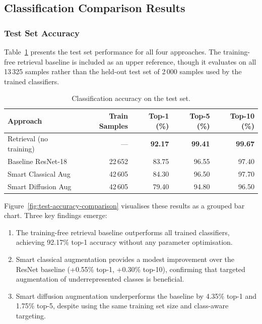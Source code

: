 \subsection{Classification Comparison Results}

\subsubsection{Test Set Accuracy}

Table~\ref{tab:classification-comparison} presents the test set performance for all four approaches.
The training-free retrieval baseline is included as an upper reference, though it evaluates on all 13\,325 samples rather than the held-out test set of 2\,000 samples used by the trained classifiers.

\begin{table}[htbp]
\centering
\caption{Classification accuracy on the test set.}
\label{tab:classification-comparison}
\begin{tabular}{lrrrr}
\toprule
\textbf{Approach} & \textbf{Train Samples} & \textbf{Top-1 (\%)} & \textbf{Top-5 (\%)} & \textbf{Top-10 (\%)} \\
\midrule
Retrieval (no training)  & ---     & \textbf{92.17} & \textbf{99.41} & \textbf{99.67} \\
Baseline ResNet-18       & 22\,652 & 83.75          & 96.55          & 97.40          \\
Smart Classical Aug      & 42\,605 & 84.30          & 96.50          & 97.70          \\
Smart Diffusion Aug      & 42\,605 & 79.40          & 94.80          & 96.50          \\
\bottomrule
\end{tabular}
\end{table}

Figure~\ref{fig:test-accuracy-comparison} visualises these results as a grouped bar chart.
Three key findings emerge:

\begin{enumerate}
    \item The training-free retrieval baseline outperforms all trained classifiers, achieving 92.17\% top-1 accuracy without any parameter optimisation.
    \item Smart classical augmentation provides a modest improvement over the ResNet baseline (+0.55\% top-1, +0.30\% top-10), confirming that targeted augmentation of underrepresented classes is beneficial.
    \item Smart diffusion augmentation underperforms the baseline by 4.35\% top-1 and 1.75\% top-5, despite using the same training set size and class-aware targeting.
\end{enumerate}

